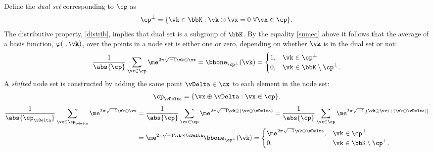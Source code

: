 \documentclass[]{elsarticle}
\theoremstyle{definition}
\theoremstyle{remark}
\begin{document}
Define the \emph{dual set} corresponding to $\cp$ as
\begin{equation*}
\cp^{\perp} = \{\vk \in \bbK : \vk \odot \vx = 0 \ \forall \vx \in \cp\}.
\end{equation*}
The distributive property, \eqref{distrib}, implies that dual set is a subgroup of $\bbK$.  By the equality \eqref{sumeq} above it follows that the average of a basis function, $\varphi(\cdot,\vk)$, over the points in a node set is either one or zero, depending on whether $\vk$ is in the dual set or not:
\begin{equation*}
 \frac{1}{\abs{\cp}} \sum_{\vx \in \cp} \me^{2 \pi \sqrt{-1} \vk \odot \vx} = \bbone_{\cp^{\perp}}(\vk) = \begin{cases} 1 , & \vk \in \cp^{\perp}\\
 0,  & \vk \in \bbK \setminus \cp^{\perp}.
 \end{cases}
\end{equation*}
A \emph{shifted} node set is constructed by adding the same point $\vDelta \in \cx$ to each element in the node set:
\begin{equation*}
\cp_{\vDelta} = \{ \vx \oplus \vDelta : \vx \in \cp\}.
\end{equation*}
\begin{align*}
\frac{1}{\abs{\cp_{\vDelta}}} \sum_{\vx \in \cp_{\vDelta}} \me^{2 \pi \sqrt{-1} \vk \odot \vx}
& = \frac{1}{\abs{\cp}} \sum_{\vx \in \cp} \me^{2 \pi \sqrt{-1} \vk \odot (\vx \oplus \vDelta)} = \frac{1}{\abs{\cp}} \sum_{\vx \in \cp} \me^{2 \pi \sqrt{-1} [(\vk \odot \vx) + (\vk \odot \vDelta)]}\\
&= \me^{2 \pi \sqrt{-1} \vk \odot \vDelta} \bbone_{\cp^{\perp}}(\vk) = \begin{cases} \me^{2 \pi \sqrt{-1} \vk \odot \vDelta} , & \vk \in \cp^{\perp}\\
 0,  & \vk \in \bbK \setminus \cp^{\perp}.
 \end{cases}
\end{align*}
\end{document}
